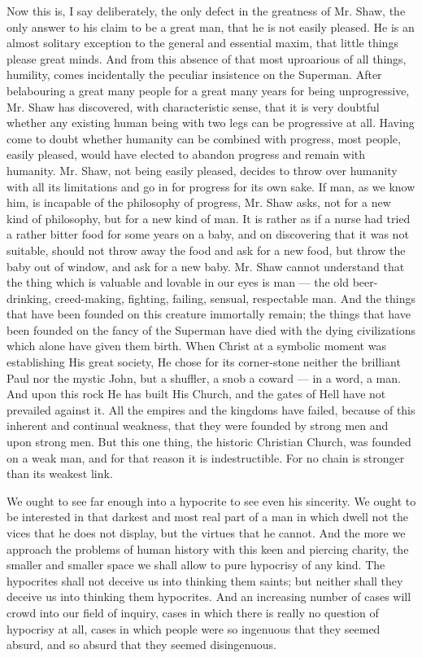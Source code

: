 Now this is, I say deliberately, the only defect in the greatness of Mr. Shaw, the only answer to his claim to be a great man, that he is not easily pleased. He is an almost solitary exception to the general and essential maxim, that little things please great minds. And from this absence of that most uproarious of all things, humility, comes incidentally the peculiar insistence on the Superman. After belabouring a great many people for a great many years for being unprogressive, Mr. Shaw has discovered, with characteristic sense, that it is very doubtful whether any existing human being with two legs can be progressive at all. Having come to doubt whether humanity can be combined with progress, most people, easily pleased, would have elected to abandon progress and remain with humanity. Mr. Shaw, not being easily pleased, decides to throw over humanity with all its limitations and go in for progress for its own sake. If man, as we know him, is incapable of the philosophy of progress, Mr. Shaw asks, not for a new kind of philosophy, but for a new kind of man. It is rather as if a nurse had tried a rather bitter food for some years on a baby, and on discovering that it was not suitable, should not throw away the food and ask for a new food, but throw the baby out of window, and ask for a new baby. Mr. Shaw cannot understand that the thing which is valuable and lovable in our eyes is man — the old beer-drinking, creed-making, fighting, failing, sensual, respectable man. And the things that have been founded on this creature immortally remain; the things that have been founded on the fancy of the Superman have died with the dying civilizations which alone have given them birth. When Christ at a symbolic moment was establishing His great society, He chose for its corner-stone neither the brilliant Paul nor the mystic John, but a shuffler, a snob a coward — in a word, a man. And upon this rock He has built His Church, and the gates of Hell have not prevailed against it. All the empires and the kingdoms have failed, because of this inherent and continual weakness, that they were founded by strong men and upon strong men. But this one thing, the historic Christian Church, was founded on a weak man, and for that reason it is indestructible. For no chain is stronger than its weakest link.


We ought to see far enough into a hypocrite to see even his sincerity. We ought to be interested in that darkest and most real part of a man in which dwell not the vices that he does not display, but the virtues that he cannot. And the more we approach the problems of human history with this keen and piercing charity, the smaller and smaller space we shall allow to pure hypocrisy of any kind. The hypocrites shall not deceive us into thinking them saints; but neither shall they deceive us into thinking them hypocrites. And an increasing number of cases will crowd into our field of inquiry, cases in which there is really no question of hypocrisy at all, cases in which people were so ingenuous that they seemed absurd, and so absurd that they seemed disingenuous.


